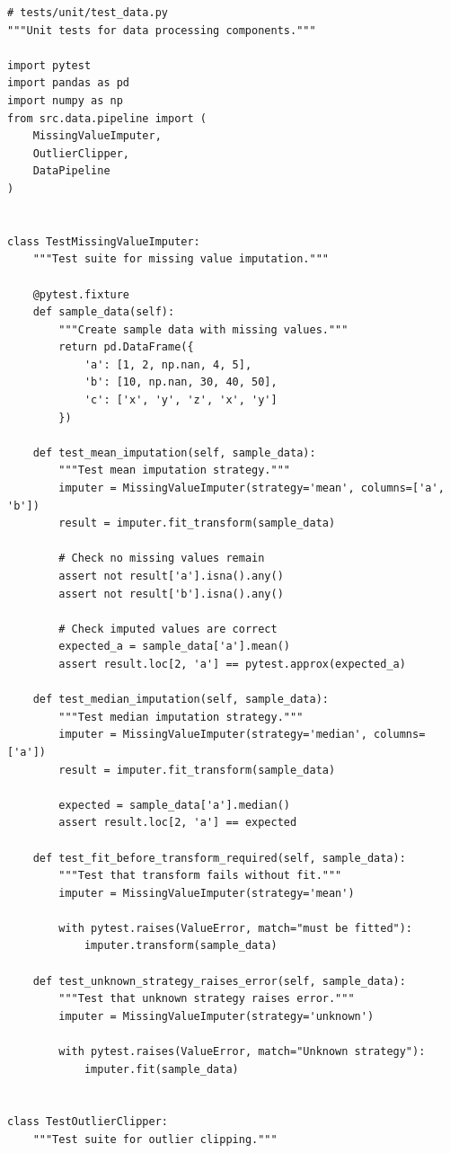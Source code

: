 \begin{lstlisting}[style=python, caption=Unit tests for data processing]
# tests/unit/test_data.py
"""Unit tests for data processing components."""

import pytest
import pandas as pd
import numpy as np
from src.data.pipeline import (
    MissingValueImputer,
    OutlierClipper,
    DataPipeline
)


class TestMissingValueImputer:
    """Test suite for missing value imputation."""

    @pytest.fixture
    def sample_data(self):
        """Create sample data with missing values."""
        return pd.DataFrame({
            'a': [1, 2, np.nan, 4, 5],
            'b': [10, np.nan, 30, 40, 50],
            'c': ['x', 'y', 'z', 'x', 'y']
        })

    def test_mean_imputation(self, sample_data):
        """Test mean imputation strategy."""
        imputer = MissingValueImputer(strategy='mean', columns=['a', 'b'])
        result = imputer.fit_transform(sample_data)

        # Check no missing values remain
        assert not result['a'].isna().any()
        assert not result['b'].isna().any()

        # Check imputed values are correct
        expected_a = sample_data['a'].mean()
        assert result.loc[2, 'a'] == pytest.approx(expected_a)

    def test_median_imputation(self, sample_data):
        """Test median imputation strategy."""
        imputer = MissingValueImputer(strategy='median', columns=['a'])
        result = imputer.fit_transform(sample_data)

        expected = sample_data['a'].median()
        assert result.loc[2, 'a'] == expected

    def test_fit_before_transform_required(self, sample_data):
        """Test that transform fails without fit."""
        imputer = MissingValueImputer(strategy='mean')

        with pytest.raises(ValueError, match="must be fitted"):
            imputer.transform(sample_data)

    def test_unknown_strategy_raises_error(self, sample_data):
        """Test that unknown strategy raises error."""
        imputer = MissingValueImputer(strategy='unknown')

        with pytest.raises(ValueError, match="Unknown strategy"):
            imputer.fit(sample_data)


class TestOutlierClipper:
    """Test suite for outlier clipping."""


\end{lstlisting}
